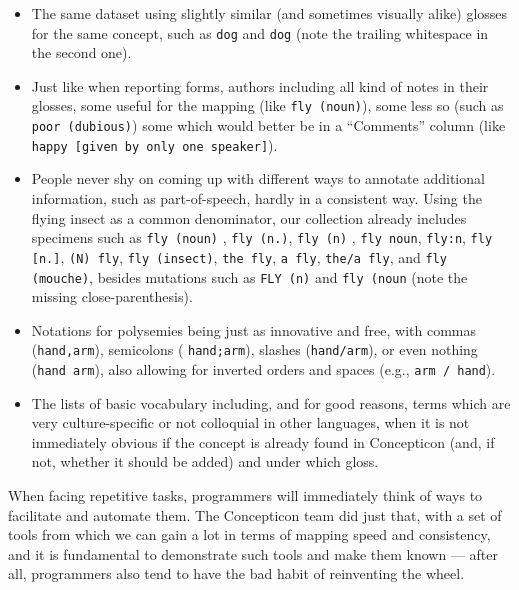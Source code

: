 \documentclass[
  a4paper,
  14pt,
  oneside,
  tablecaptionabove
]{scrbook}
\newcommand{\passthrough}[1]{#1}
\begin{document}
\begin{itemize}
\item The
same dataset using slightly similar (and sometimes visually alike)
glosses for the same concept, such as \passthrough{\lstinline!dog!} and
\passthrough{\lstinline!dog!} (note the trailing whitespace in the
second one).
\item Just like when reporting forms, authors including all kind
of notes
in their glosses, some useful for the mapping (like
\passthrough{\lstinline!fly (noun)!}), some
less so (such as \passthrough{\lstinline!poor (dubious)!}) some which
would better be in a \enquote{Comments} column (like
\passthrough{\lstinline!happy [given by only one speaker]!}).
\item People
never shy on coming up with different ways to annotate
additional information, such as part-of-speech, hardly in a consistent
way. Using the flying insect as a common denominator, our collection
already includes specimens such as \passthrough{\lstinline!fly (noun)!}
, \passthrough{\lstinline!fly (n.)!}, \passthrough{\lstinline!fly (n)!}
, \passthrough{\lstinline!fly noun!}, \passthrough{\lstinline!fly:n!},
\passthrough{\lstinline!fly [n.]!}, \passthrough{\lstinline!(N) fly!},
\passthrough{\lstinline!fly (insect)!},
\passthrough{\lstinline!the fly!}, \passthrough{\lstinline!a fly!},
\passthrough{\lstinline!the/a fly!}, and
\passthrough{\lstinline!fly (mouche)!}, besides mutations such as
\passthrough{\lstinline!FLY (n)!} and
\passthrough{\lstinline!fly (noun!} (note the missing
close-parenthesis).
\item Notations for polysemies being just as innovative
and free, with commas (\passthrough{\lstinline!hand,arm!}), semicolons
( \passthrough{\lstinline!hand;arm!}), slashes (\passthrough{\lstinline!hand/arm!}), or
even nothing (\passthrough{\lstinline!hand arm!}), also allowing for inverted orders
and spaces (e.g., \passthrough{\lstinline!arm / hand!}).
\item The lists of
basic vocabulary including, and for good reasons, terms which are very
culture-specific or not colloquial in other languages, when it is not
immediately obvious if the concept is already found in Concepticon (and,
if not, whether it should be added) and under which gloss.
\end{itemize}

When facing repetitive tasks, programmers will immediately think of ways
to facilitate and automate them. The Concepticon team did just that,
with a set of tools from which we can gain a lot in terms of mapping
speed and consistency, and it is fundamental to demonstrate such tools
and make them known --- after all, programmers also tend to have the bad
habit of reinventing the wheel.
\end{document}
